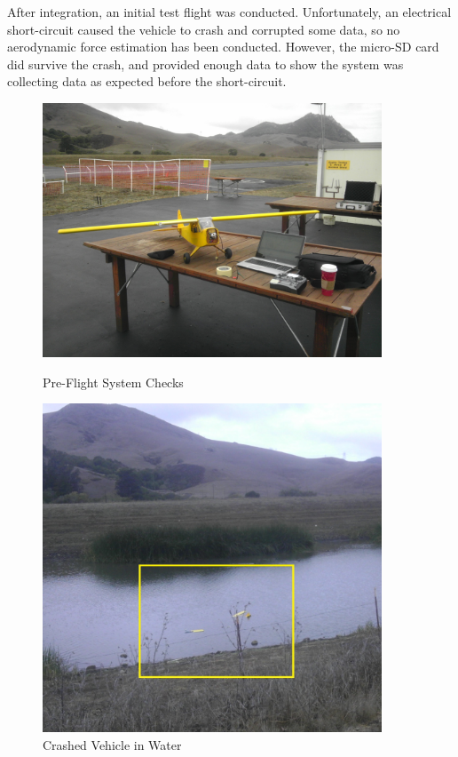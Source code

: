 After integration, an initial test flight was conducted. Unfortunately, an electrical short-circuit caused the vehicle to  crash and corrupted some data, so no aerodynamic force estimation has been conducted. However, the micro-SD card did survive the crash, and provided enough data to show the system was collecting data as expected before the short-circuit.
\begin{figure}[H]
\label{sysIntPics}
\begin{center}
\begin{minipage}[b]{0.4\linewidth}
\label{preFlightFig}
  \centering
    \includegraphics[width=0.9\textwidth]{figures/preFlight.jpg}
    \caption{Pre-Flight System Checks}
\end{minipage}
\begin{minipage}[b]{0.4\linewidth}
  \centering
    \includegraphics[width=0.9\textwidth]{figures/crash.jpg}
    \caption{Crashed Vehicle in Water}
\end{minipage}
\end{center}
\end{figure}

